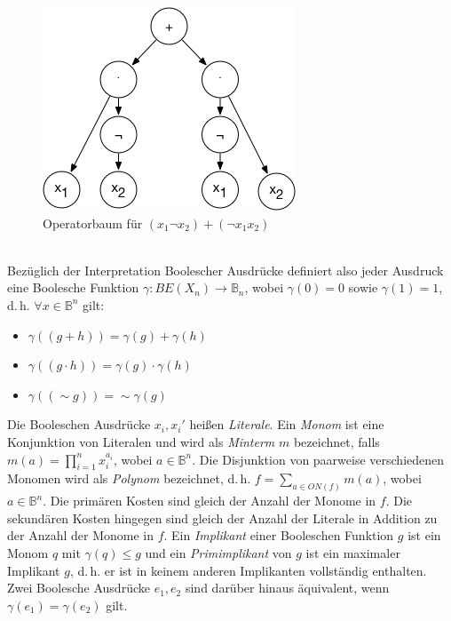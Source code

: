 \begin{figure}[bth]
	\centering
	\includegraphics[scale=0.5]{./img/obaum}
	\caption[Operatorbaum für $(x_1\neg x_2)+(\neg x_1x_2)$]{Operatorbaum für $(x_1\neg x_2)+(\neg x_1x_2)$}
	\label{fig:obaum}
\end{figure}\\
\noindent
Bezüglich der Interpretation Boolescher Ausdrücke definiert also jeder Ausdruck eine Boolesche Funktion $\gamma : BE(X_n) \rightarrow \mathbb{B}_n$, wobei $\gamma(0) = 0$ sowie $\gamma(1) = 1$, d.\,h. $\forall x \in \mathbb{B}^n$ gilt:
\begin{itemize}
	\item $\gamma((g + h)) = \gamma(g) + \gamma(h)$
	\item $\gamma((g \cdot h)) = \gamma(g) \cdot \gamma(h)$
	\item $\gamma((\sim g)) = \sim \gamma(g)$
\end{itemize}
Die Booleschen Ausdrücke $x_i, x_i'$ heißen \emph{Literale}. Ein \emph{Monom} ist eine Konjunktion von Literalen und wird als \emph{Minterm} $m$ bezeichnet, falls $m(a) = \prod_{i=1}^{n}x_i^{a_i}$, wobei $a \in \mathbb{B}^n$. Die Disjunktion von paarweise verschiedenen Monomen wird als \emph{Polynom} bezeichnet, d.\,h. $f = \sum_{a \in ON(f)}m(a)$, wobei $a \in \mathbb{B}^n$. Die primären Kosten sind gleich der Anzahl der Monome in $f$. Die sekundären Kosten hingegen sind gleich der Anzahl der Literale in Addition zu der Anzahl der Monome in $f$. Ein \emph{Implikant} einer Booleschen Funktion $g$ ist ein Monom $q$ mit $\gamma(q) \leq g$ und ein \emph{Primimplikant} von $g$ ist ein maximaler Implikant $g$, d.\,h. er ist in keinem anderen Implikanten vollständig enthalten. Zwei Boolesche Ausdrücke $e_1, e_2$ sind darüber hinaus äquivalent, wenn $\gamma(e_1) = \gamma(e_2)$ gilt.
